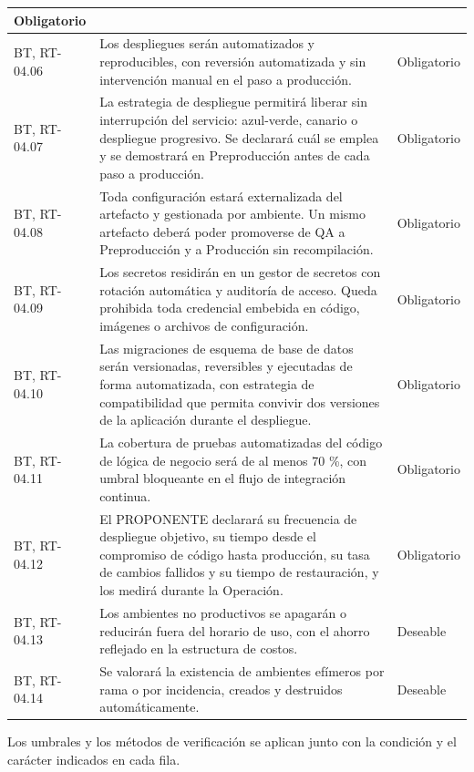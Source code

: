 \begin{longtable}{|L{0.098425\AnchoTablaAnexo}|L{0.814961\AnchoTablaAnexo}|L{0.086614\AnchoTablaAnexo}|}
Obligatorio \\ \hline
BT, RT-04.06 &
Los despliegues serán automatizados y reproducibles, con reversión automatizada y sin intervención manual en el paso a producción. &
Obligatorio \\ \hline
{}
BT, RT-04.07 &
La estrategia de despliegue permitirá liberar sin interrupción del servicio: azul-verde, canario o despliegue progresivo. Se declarará cuál se emplea y se demostrará en Preproducción antes de cada paso a producción. &
Obligatorio \\ \hline
BT, RT-04.08 &
Toda configuración estará externalizada del artefacto y gestionada por ambiente. Un mismo artefacto deberá poder promoverse de QA a Preproducción y a Producción sin recompilación. &
Obligatorio \\ \hline
{}
BT, RT-04.09 &
Los secretos residirán en un gestor de secretos con rotación automática y auditoría de acceso. Queda prohibida toda credencial embebida en código, imágenes o archivos de configuración. &
Obligatorio \\ \hline
BT, RT-04.10 &
Las migraciones de esquema de base de datos serán versionadas, reversibles y ejecutadas de forma automatizada, con estrategia de compatibilidad que permita convivir dos versiones de la aplicación durante el despliegue. &
Obligatorio \\ \hline
{}
BT, RT-04.11 &
La cobertura de pruebas automatizadas del código de lógica de negocio será de al menos 70 \%, con umbral bloqueante en el flujo de integración continua. &
Obligatorio \\ \hline
BT, RT-04.12 &
El PROPONENTE declarará su frecuencia de despliegue objetivo, su tiempo desde el compromiso de código hasta producción, su tasa de cambios fallidos y su tiempo de restauración, y los medirá durante la Operación. &
Obligatorio \\ \hline
{}
BT, RT-04.13 &
Los ambientes no productivos se apagarán o reducirán fuera del horario de uso, con el ahorro reflejado en la estructura de costos. &
Deseable \\ \hline
BT, RT-04.14 &
Se valorará la existencia de ambientes efímeros por rama o por incidencia, creados y destruidos automáticamente. &
Deseable \\ \hline
\end{longtable}

Los umbrales y los métodos de verificación se aplican junto con la condición y el carácter indicados en cada fila.
